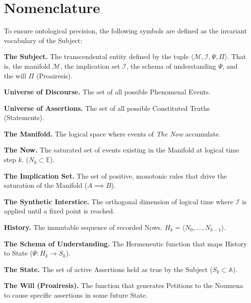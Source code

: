 \documentclass[11pt, a4paper]{article}
\theoremstyle{formalism}
\begin{document}
\section*{Nomenclature}

To ensure ontological precision, the following symbols are defined as the
invariant vocabulary of the Subject:

\begin{description}[style=multiline, leftmargin=3cm, font=\bfseries]

    \item[$\mathcal{S}$] \textbf{The Subject.} The transcendental entity
        defined by the tuple $\langle \mathcal{M}, \mathcal{I}, \Psi, \Pi
        \rangle$. That is, the manifold $\mathcal{M}$, the implication set $\mathcal{I}$,
        the schema of understanding $\Psi$, and the will $\Pi$ (Proairesis).
    
    \item[$\mathbb{E}$] \textbf{Universe of Discourse.} The set of all possible
        Phenomenal Events.
    
    \item[$\mathbb{A}$] \textbf{Universe of Assertions.} The set of all
        possible Constituted Truths (Statements).
    
    \item[$\mathcal{M}$] \textbf{The Manifold.} The logical space where events
        of \textit{The Now} accumulate. 
    
    \item[$N_k$] \textbf{The Now.} The saturated set of events existing in the
        Manifold at logical time step $k$. ($N_k \subset \mathbb{E}$).
    
    \item[$\mathcal{I}$] \textbf{The Implication Set.} The set of positive,
        monotonic rules that drive the saturation of the Manifold ($A \implies
        B$).
    
    \item[$\sigma$] \textbf{The Synthetic Interstice.} The
        orthogonal dimension of logical time where $\mathcal{I}$ is applied
        until a fixed point is reached.
    
    \item[$H_k$] \textbf{History.} The immutable sequence of recorded Nows.
        $H_k = \langle N_0, \dots, N_{k-1} \rangle$.
    
    \item[$\Psi$] \textbf{The Schema of Understanding.} The Hermeneutic
        function that maps History to State ($\Psi: H_k \to S_k$).
    
    \item[$S_k$] \textbf{The State.} The set of active Assertions held as true
        by the Subject ($S_k \subset \mathbb{A}$).
    
    \item[$\Pi$] \textbf{The Will (Proairesis).} The function that generates 
        Petitions to the Noumena to cause specific assertions in some future State.

\end{description}
\end{document}
